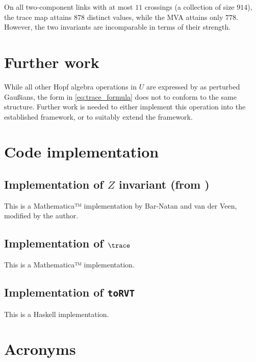 \documentclass{article}
\begin{document}
On all two-component links with at most $11$ crossings (a collection of size
$914$), the trace map attains $878$ distinct values, while the MVA attains only
$778$. However, the two invariants are incomparable in terms of their strength.

\section{Further work}
While all other Hopf algebra operations in $U$ are expressed by \cite{BV} as
perturbed Gaußians, the form in \cref{eq:trace_formula} does not to conform to
the same structure. Further work is needed to either implement this operation
into the established framework, or to suitably extend the framework.

\appendix

\section{Code implementation}

\subsection{Implementation of $Z$ invariant (from \cite{BV})}

This is a Mathematica™ implementation by Bar-Natan and van der Veen, modified by
the author.

\subsection{Implementation of $\trace$}

This is a Mathematica™ implementation.

\subsection{Implementation of \lstinline|toRVT|}

This is a Haskell implementation.

\section{Acronyms}
\begin{acronym}
\end{acronym}

\printbibliography
\end{document}
